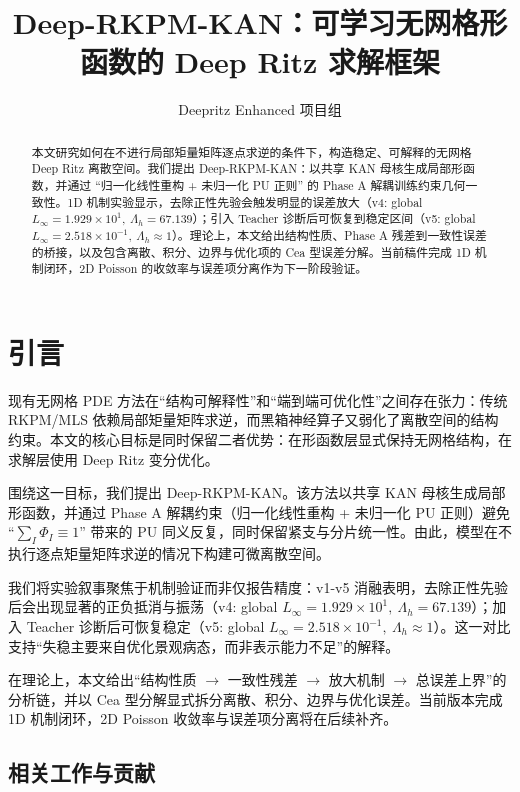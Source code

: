 ﻿\documentclass[lang=cn,a4paper]{elegantpaper}
\title{Deep-RKPM-KAN：可学习无网格形函数的 Deep Ritz 求解框架}
\author{Deepritz Enhanced 项目组}
\institute{Deepritz Enhanced}
\date{\zhdate{2026/03/03}}
\begin{document}
\maketitle

\begin{abstract}
本文研究如何在不进行局部矩量矩阵逐点求逆的条件下，构造稳定、可解释的无网格 Deep Ritz 离散空间。我们提出 Deep-RKPM-KAN：以共享 KAN 母核生成局部形函数，并通过 ``归一化线性重构 + 未归一化 PU 正则'' 的 Phase A 解耦训练约束几何一致性。1D 机制实验显示，去除正性先验会触发明显的误差放大（v4: global $L_\infty=1.929\times10^1,\ \Lambda_h=67.139$）；引入 Teacher 诊断后可恢复到稳定区间（v5: global $L_\infty=2.518\times10^{-1},\ \Lambda_h\approx1$）。理论上，本文给出结构性质、Phase A 残差到一致性误差的桥接，以及包含离散、积分、边界与优化项的 Cea 型误差分解。当前稿件完成 1D 机制闭环，2D Poisson 的收敛率与误差项分离作为下一阶段验证。
\end{abstract}

\section{引言}
现有无网格 PDE 方法在“结构可解释性”和“端到端可优化性”之间存在张力：传统 RKPM/MLS 依赖局部矩量矩阵求逆，而黑箱神经算子又弱化了离散空间的结构约束。本文的核心目标是同时保留二者优势：在形函数层显式保持无网格结构，在求解层使用 Deep Ritz 变分优化。

围绕这一目标，我们提出 Deep-RKPM-KAN。该方法以共享 KAN 母核生成局部形函数，并通过 Phase A 解耦约束（归一化线性重构 + 未归一化 PU 正则）避免 ``$\sum_I\Phi_I\equiv1$'' 带来的 PU 同义反复，同时保留紧支与分片统一性。由此，模型在不执行逐点矩量矩阵求逆的情况下构建可微离散空间。

我们将实验叙事聚焦于机制验证而非仅报告精度：v1-v5 消融表明，去除正性先验后会出现显著的正负抵消与振荡（v4: global $L_\infty=1.929\times10^1,\ \Lambda_h=67.139$）；加入 Teacher 诊断后可恢复稳定（v5: global $L_\infty=2.518\times10^{-1},\ \Lambda_h\approx1$）。这一对比支持“失稳主要来自优化景观病态，而非表示能力不足”的解释。

在理论上，本文给出“结构性质 $\rightarrow$ 一致性残差 $\rightarrow$ 放大机制 $\rightarrow$ 总误差上界”的分析链，并以 Cea 型分解显式拆分离散、积分、边界与优化误差。当前版本完成 1D 机制闭环，2D Poisson 收敛率与误差项分离将在后续补齐。
\subsection{相关工作与贡献}
\end{document}
